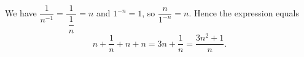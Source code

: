 We have $\dfrac1{n^{-1}}=\dfrac{1}{\ \dfrac1n\ }=n$ and $1^{-n}=1$, so $\dfrac{n}{1^{-n}}=n$. Hence the expression equals
\[n+\dfrac1n+n+n=\boxed{3n+\dfrac1n}=\dfrac{3n^2+1}{n}.\]
